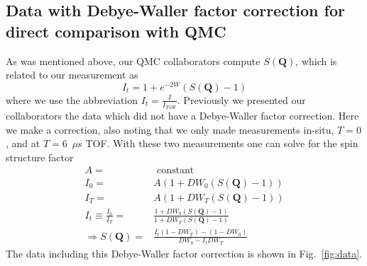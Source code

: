 \documentclass[11pt,letter]{article}
\newcommand{\bv}[1]{\ensuremath{\bm{#1}}}
\begin{document}
\subsection{Data with Debye-Waller factor correction for direct comparison with QMC} 
As was mentioned above, our QMC collaborators compute $S(\bv{Q})$, which is related to our measurement as 
\begin{equation}
 I_{t} = 1 +  e^{-2W}( S(\bv{Q}) - 1 )
\end{equation}
where we use the abbreviation $I_{t} = \frac{I}{I_{\mathrm{TOF}}}$.  Previously
we presented our collaborators the data  which did not have a Debye-Waller
factor correction.   Here we make a correction, also noting that we only made
measurements in-situ, $T=0$,  and at $T=6$~$\mu$s TOF.   With these two measurements one can
solve for the spin structure factor 
\begin{equation}
\begin{split}
    A = & \,\,\mathrm{constant }\\
 I_{0} = &A( 1 +  DW_{0}( S(\bv{Q}) - 1 ) ) \\
 I_{T} = &A( 1 +  DW_{T}( S(\bv{Q}) - 1 ) ) \\
 I_{t} \equiv \frac{ I_{0}}{I_{T}} =& \frac{ 1 + DW_{0}(S(\bv{Q})-1) }{ 1 + DW_{T}(S(\bv{Q})-1)} \\
\Rightarrow S(\bv{Q}) =& \frac{  I_{t}(1-DW_{T}) - (1-DW_{0})}{ DW_{0} - I_{t}DW_{T} }\end{split} 
\end{equation}
The data including this Debye-Waller factor correction is shown in Fig.~\ref{fig:data}.
\end{document}
